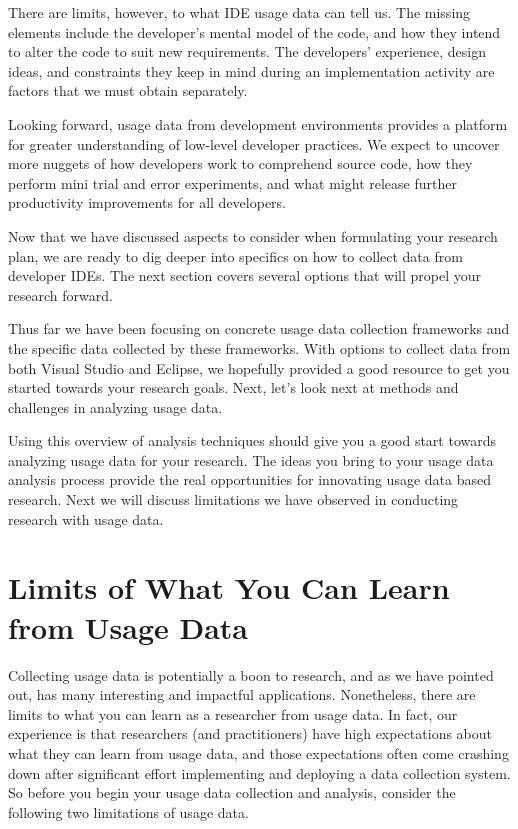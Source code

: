 \documentclass{book}
\begin{document}
There are limits, however, to what IDE usage data can tell us.  The missing elements include the developer's mental model of the code, and how they intend to alter the code to suit new requirements.  The developers' experience, design ideas, and constraints they keep in mind during an implementation activity are factors that we must obtain separately.  

Looking forward, usage data from development environments provides a platform for greater understanding of low-level developer practices.  We expect to uncover more nuggets of how developers work to comprehend source code, how they perform mini trial and error experiments, and what might release further productivity improvements for all developers.


\pagebreak






Now that we have discussed aspects to consider when formulating your research plan, we are ready to dig deeper into specifics on how to collect data from developer IDEs.  The next section covers several options that will propel your research forward.






Thus far we have been focusing on concrete usage data collection frameworks and the specific data collected by these frameworks.  With options to collect data from both Visual Studio and Eclipse, we hopefully provided a good resource to get you started towards your research goals.  Next, let's look next at methods and challenges in analyzing usage data.

\newpage




Using this overview of analysis techniques should give you a good start towards analyzing usage data for your research.
The ideas you bring to your usage data analysis process provide the real opportunities for innovating usage data based research.  Next we will discuss limitations we have observed in conducting research with usage data.

\section{Limits of What You Can Learn from Usage Data}
\label{sec:limitations}

Collecting usage data is potentially a boon to research, and as we have
pointed out, has many interesting and impactful applications.
Nonetheless, there are limits to what you can learn as a researcher
from usage data.
In fact, our experience is that researchers (and practitioners) have
high expectations about what they can learn from usage data, and those
expectations often come crashing down after significant effort implementing
and deploying a data collection system.
So before you begin your usage data collection and analysis, consider
the following two limitations of usage data.
\end{document}
